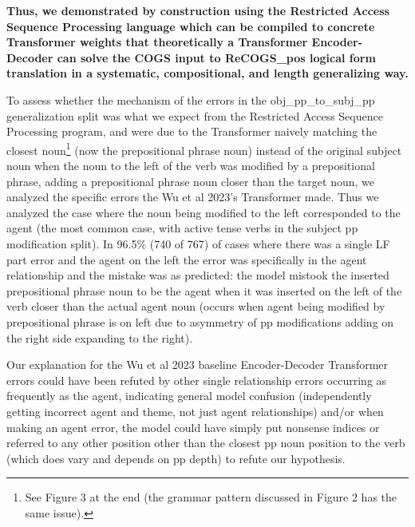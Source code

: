 \documentclass[11pt]{article}
\begin{document}
\textbf{Thus, we demonstrated by construction using the Restricted Access Sequence Processing language which can be compiled to concrete Transformer weights that theoretically a Transformer Encoder-Decoder can solve the COGS input to ReCOGS\_pos logical form translation in a systematic, compositional, and length generalizing way.}

To assess whether the mechanism of the errors in the obj\_pp\_to\_subj\_pp generalization split was what we expect from the Restricted Access Sequence Processing program, and were due to the Transformer naively matching the closest noun\footnote{
See Figure 3 at the end (the grammar pattern discussed in Figure 2 has the same issue).
} (now the prepositional phrase noun) instead of the original subject noun when the noun to the left of the verb was modified by a prepositional phrase, adding a prepositional phrase noun closer than the target noun, we analyzed the specific errors the Wu et al 2023's Transformer made. Thus we analyzed the case where the noun being modified to the left corresponded to the agent (the most common case, with active tense verbs in the subject pp modification split). In 96.5\% (740 of 767) of cases where there was a single LF part error and the agent on the left the error was specifically in the agent relationship and the mistake was as predicted: the model mistook the inserted prepositional phrase noun to be the agent when it was inserted on the left of the verb closer than the actual agent noun (occurs when agent being modified by prepositional phrase is on left due to asymmetry of pp modifications adding on the right side expanding to the right).

Our explanation for the Wu et al 2023 baseline Encoder-Decoder Transformer errors could have been refuted by other single relationship errors occurring as frequently as the agent, indicating general model confusion (independently getting incorrect agent and theme, not just agent relationships) and/or when making an agent error, the model could have simply put nonsense indices or referred to any other position other than the closest pp noun position to the verb (which does vary and depends on pp depth) to refute our hypothesis.
\end{document}
